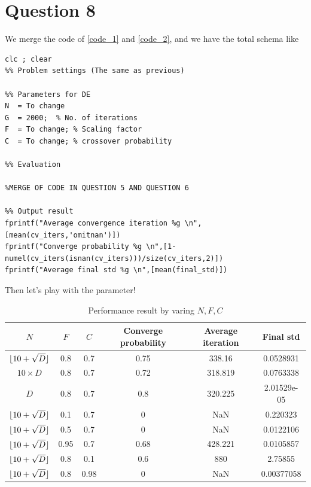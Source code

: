 \documentclass{CSArticle}[english]
\begin{document}
\section{Question 8}
We merge the code of \ref{code_1} and \ref{code_2}, and we have the total schema like
\begin{lstlisting}[style=MATLAB]
clc ; clear
%% Problem settings (The same as previous)

%% Parameters for DE
N  = To change
G  = 2000;	% No. of iterations
F  = To change;	% Scaling factor
C  = To change;	% crossover probability

%% Evaluation

%MERGE OF CODE IN QUESTION 5 AND QUESTION 6

%% Output result
fprintf("Average convergence iteration %g \n",[mean(cv_iters,'omitnan')]) 
fprintf("Converge probability %g \n",[1-numel(cv_iters(isnan(cv_iters)))/size(cv_iters,2)]) 
fprintf("Average final std %g \n",[mean(final_std)]) 
\end{lstlisting}
Then let's play with the parameter!
\begin{table}[h!]
\begin{tabular}{|c|c|c|c|c|c|}
\hline
$N$                 & $F$    & $C$    & Converge probability & Average iteration & Final std \\ \hline
$\lfloor 10+\sqrt{D} \rfloor$ & 0.8  & 0.7  &    0.75                   &     338.16                &     0.0528931        \\ \hline
$10\times D$      & 0.8  & 0.7  & 0.72                 & 318.819           & 0.0763338 \\ \hline
$D$      & 0.8  & 0.7  & 0.8                 & 320.225           & 2.01529e-05  \\ \hline
$\lfloor 10+\sqrt{D} \rfloor$ & 0.1  & 0.7  &    0                  &     NaN               &     0.220323       \\ \hline
$\lfloor 10+\sqrt{D} \rfloor$ & 0.5  & 0.7  &    0                  &     NaN               &     0.0122106       \\ \hline
$\lfloor 10+\sqrt{D} \rfloor$ & 0.95 & 0.7  &                   0.68    &        428.221            &      0.0105857      \\ \hline
$\lfloor 10+\sqrt{D} \rfloor$ & 0.8  & 0.1  &                 0.6     &         880            &       2.75855     \\ \hline
$\lfloor 10+\sqrt{D} \rfloor$ & 0.8  & 0.98 &                 0      &           NaN        &      0.00377058      \\ \hline
\end{tabular}
\caption{Performance result by varing $N,F,C$}
\end{table}
\end{document}

